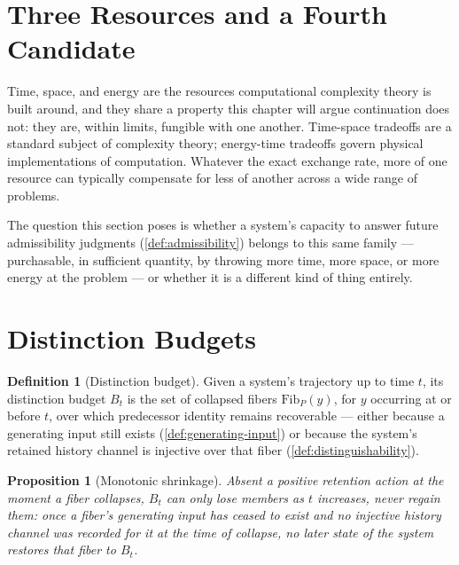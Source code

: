 \documentclass[11pt]{book}
\theoremstyle{plain}
\newtheorem{proposition}[theorem]{Proposition}
\theoremstyle{definition}
\newtheorem{definition}[theorem]{Definition}
\theoremstyle{remark}
\begin{document}
\section{Three Resources and a Fourth Candidate}

Time, space, and energy are the resources computational complexity
theory is built around, and they share a property this chapter will
argue continuation does not: they are, within limits, fungible with
one another. Time-space tradeoffs are a standard subject of complexity
theory; energy-time tradeoffs govern physical implementations of
computation. Whatever the exact exchange rate, more of one resource
can typically compensate for less of another across a wide range of
problems.

The question this section poses is whether a system's capacity to
answer future admissibility judgments (\cref{def:admissibility})
belongs to this same family --- purchasable, in sufficient quantity,
by throwing more time, more space, or more energy at the problem --- or
whether it is a different kind of thing entirely.

\section{Distinction Budgets}

\begin{definition}[Distinction budget]
\label{def:distinction-budget}
Given a system's trajectory up to time $t$, its distinction budget
$B_t$ is the set of collapsed fibers $\mathrm{Fib}_P(y)$, for $y$
occurring at or before $t$, over which predecessor identity remains
recoverable --- either because a generating input still exists
(\cref{def:generating-input}) or because the system's retained history
channel is injective over that fiber (\cref{def:distinguishability}).
\end{definition}

\begin{proposition}[Monotonic shrinkage]
\label{prop:monotonic-shrinkage}
Absent a positive retention action at the moment a fiber collapses,
$B_t$ can only lose members as $t$ increases, never regain them: once
a fiber's generating input has ceased to exist and no injective
history channel was recorded for it at the time of collapse, no later
state of the system restores that fiber to $B_t$.
\end{proposition}
\end{document}
